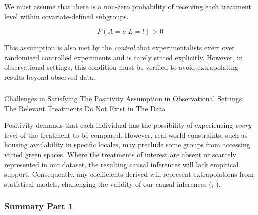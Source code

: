 \documentclass[
  singlecolumn]{article}
\makeatletter
\let\oldsubparagraph\subparagraph
\renewcommand{\subparagraph}{
    \@ifstar
      \xxxSubParagraphStar
      \xxxSubParagraphNoStar
  }
\newcommand{\xxxSubParagraphStar}[1]{\oldsubparagraph*{#1}\mbox{}}
\newcommand{\xxxSubParagraphNoStar}[1]{\oldsubparagraph{#1}\mbox{}}
\makeatother
\begin{document}
We must assume that there is a non-zero probability of receiving each
treatment level within covariate-defined subgroups.

\[
P(A = a | L= l) > 0
\]

This assumption is also met by the \emph{control} that experimentalists
exert over randomised controlled experiments and is rarely stated
explicitly. However, in observational settings, this condition must be
verified to avoid extrapolating results beyond observed data.

\subparagraph{Challenges in Satisfying The Positivity Assumption in
Observational Settings: The Relevant Treatments Do Not Exist in The
Data}\label{challenges-in-satisfying-the-positivity-assumption-in-observational-settings-the-relevant-treatments-do-not-exist-in-the-data}

Positivity demands that each individual has the possibility of
experiencing \emph{every} level of the treatment to be compared.
However, real-world constraints, such as housing availability in
specific locales, may preclude some groups from accessing varied green
spaces. Where the treatments of interest are absent or scarcely
represented in our dataset, the resulting causal inferences will lack
empirical support. Consequently, any coefficients derived will represent
extrapolations from statistical models, challenging the validity of our
causal inferences (;
).

\subsubsection{Summary Part 1}\label{summary-part-1}
\end{document}
